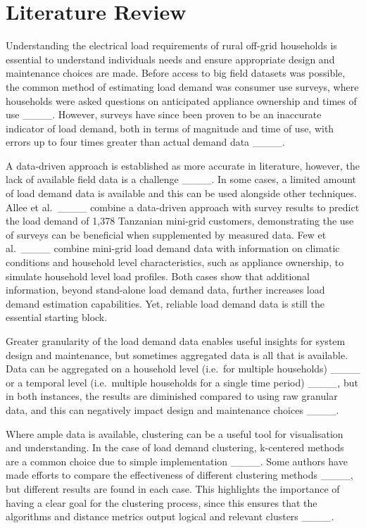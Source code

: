 \section{Literature Review}
Understanding the electrical load requirements of rural off-grid households is essential to understand individuals needs and ensure appropriate design and maintenance choices are made. Before access to big field datasets was possible, the common method of estimating load demand was consumer use surveys, where households were asked questions on anticipated appliance ownership and times of use ____. However, surveys have since been proven to be an inaccurate indicator of load demand, both in terms of magnitude and time of use, with errors up to four times greater than actual demand data ____. 

A data-driven approach is established as more accurate in literature, however, the lack of available field data is a challenge ____. In some cases, a limited amount of load demand data is available and this can be used alongside other techniques. Allee et al.\ ____ combine a data-driven approach with survey results to predict the load demand of 1,378 Tanzanian mini-grid customers, demonstrating the use of surveys can be beneficial when supplemented by measured data. Few et al.\ ____ combine mini-grid load demand data with information on climatic conditions and household level characteristics, such as appliance ownership, to simulate household level load profiles. Both cases show that additional information, beyond stand-alone load demand data, further increases load demand estimation capabilities. Yet, reliable load demand data is still the essential starting block.

Greater granularity of the load demand data enables useful insights for system design and maintenance, but sometimes aggregated data is all that is available. Data can be aggregated on a household level (i.e.\ for multiple households) ____ or a temporal level (i.e.\ multiple households for a single time period) ____, but in both instances, the results are diminished compared to using raw granular data, and this can negatively impact design and maintenance choices ____.

Where ample data is available, clustering can be a useful tool for visualisation and understanding. In the case of load demand clustering, k-centered methods are a common choice due to simple implementation ____. Some authors have made efforts to compare the effectiveness of different clustering methods ____, but different results are found in each case. This highlights the importance of having a clear goal for the clustering process, since this ensures that the algorithms and distance metrics output logical and relevant clusters ____. 

